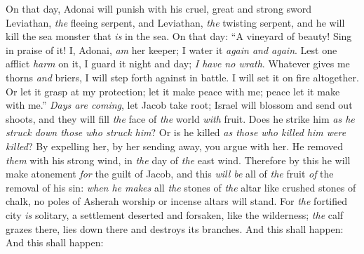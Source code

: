 \begin{biblechapter} %
 On that day, Adonai will punish with his cruel, great and strong sword Leviathan, \textit{the} fleeing serpent, and Leviathan, \textit{the} twisting serpent, and he will kill the sea monster that \textit{is} in the sea.
\verse On that day:
\verse “A vineyard of beauty! Sing in praise of it!
\verse I, Adonai, \textit{am} her keeper; 
I water it \textit{again and again}. 
Lest one afflict \textit{harm} on it, 
I guard it night and day;
\verse \textit{I have no wrath}. 
Whatever gives me thorns \textit{and} briers, 
I will step forth against in battle. 
I will set it on fire altogether.
\verse Or let it grasp at my protection; 
let it make peace with me; 
peace let it make with me.”
\verse \textit{Days are coming}, let Jacob take root; 
Israel will blossom and send out shoots, 
and they will fill \textit{the} face of \textit{the} world \textit{with} fruit.
\verse Does he strike him \textit{as he struck down those who struck him}? 
Or is he killed \textit{as those who killed him were killed}?
\verse By expelling her, by her sending away, you argue with her. 
He removed \textit{them} with his strong wind, 
in \textit{the} day of \textit{the} east wind.
\verse Therefore by this he will make atonement \textit{for} the guilt of Jacob, 
and this \textit{will be} all of \textit{the} fruit \textit{of} the removal of his sin: 
\textit{when he makes} all \textit{the} stones of \textit{the} altar like crushed stones of chalk, 
no poles of Asherah worship or incense altars will stand.
\verse For \textit{the} fortified city \textit{is} solitary, 
a settlement deserted and forsaken, like the wilderness; 
\textit{the} calf grazes there, 
lies down there and destroys its branches.
\verse And this shall happen:
\verse And this shall happen:
\end{biblechapter}

